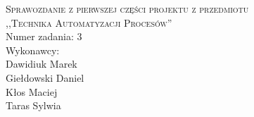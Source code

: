 \documentclass[a4paper,titlepage,11pt,twosides,floatssmall]{mwrep}
\begin{document}
	
	\begin{titlepage}
		\begin{center}
			\Huge{\textsc{Sprawozdanie z pierwszej części projektu z przedmiotu \\,,Technika Automatyzacji Procesów''}} \\
			[15cm]
			\Large{Numer zadania: 3 \\Wykonawcy:}\\
			\Large{Dawidiuk Marek \\ Giełdowski Daniel \\ Kłos Maciej \\ Taras Sylwia}
		\end{center}
	\end{titlepage}
	
	\tableofcontents
	\newpage
	
	
\end{document}
